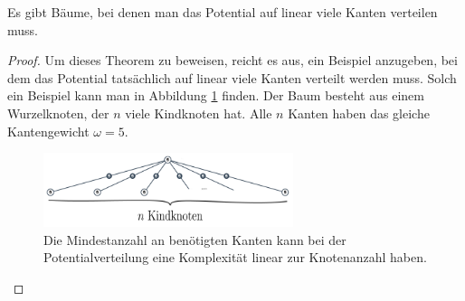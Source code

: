 \begin{theorem}\label{theorem_pot_auf_linear_vielen_kanten}
	Es gibt Bäume, bei denen man das Potential auf linear viele Kanten verteilen muss.
\end{theorem}	
\begin{proof}
	Um dieses Theorem zu beweisen, reicht es aus, ein Beispiel anzugeben, bei dem das Potential tatsächlich auf linear viele Kanten verteilt werden muss. Solch ein Beispiel kann man in Abbildung \ref{abb_bsp_potverteilen} finden. Der Baum besteht aus einem Wurzelknoten, der $n$ viele Kindknoten hat. Alle $n$ Kanten haben das gleiche Kantengewicht $\omega = 5$.
	
		\begin{figure}[htb]
			\includegraphics[width=0.65\textwidth]{bilder/abb_bsp_potverteilen.png} 
			\captionsetup{width=0.65\textwidth}
			\caption{Die Mindestanzahl an benötigten Kanten kann bei der Potentialverteilung eine Komplexität linear zur Knotenanzahl haben.}
			\label{abb_bsp_potverteilen}
		\end{figure}
		

\end{proof}
